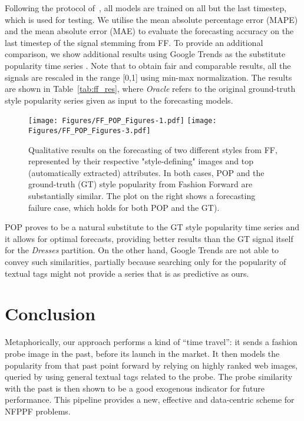 \documentclass[runningheads]{llncs}
\newcommand{\snamebig}[0] {POP\xspace}
\begin{document}
Following the protocol of~\cite{al2017fashion}, all models are trained on all but the last timestep, which is used for testing. We utilise the mean absolute percentage error (MAPE) and the mean absolute error (MAE) to evaluate the forecasting accuracy on the last timestep of the signal stemming from FF. To provide an additional comparison, we show additional results using Google Trends as the substitute popularity time series \cite{skenderi2021well}. Note that to obtain fair and comparable results, all the signals are rescaled in the range [0,1] using min-max normalization. The results are shown in Table~\ref{tab:ff_res}, where \textit{Oracle} refers to the original ground-truth style popularity series given as input to the forecasting models. 

 \begin{figure}[t!]
        \centering
        \texttt{[image: Figures/FF\_POP\_Figures-1.pdf]}
        \texttt{[image: Figures/FF\_POP\_Figures-3.pdf]}
        \caption{\footnotesize Qualitative results on the forecasting of two different styles from FF, represented by their respective "style-defining" images and top (automatically extracted) attributes.
        In both cases, \snamebig and the ground-truth (GT) style popularity from Fashion Forward are substantially similar. The plot on the right shows a forecasting failure case, which holds for both \snamebig and the GT).}
        \label{fig:qlt_amazon}
        \vspace{-0.5cm}
\end{figure}


\snamebig proves to be a natural substitute to the GT style popularity time series and it allows for optimal forecasts, providing better results than the GT signal itself for the \emph{Dresses} partition. On the other hand, Google Trends are not able to convey such similarities, partially because searching only for the popularity of textual tags might not provide a series that is as predictive as ours. 
 
\section{Conclusion}
\label{sec:conclusion}
Metaphorically, our approach performs a kind of ``time travel'': it sends a fashion probe image in the past, before its launch in the market. It then models the popularity from that past point forward by relying on highly ranked web images, queried by using general textual tags related to the probe. The probe similarity with the past is then shown to be a good exogenous indicator for future performance. This pipeline provides a new, effective and data-centric scheme for NFPPF problems.
\end{document}
